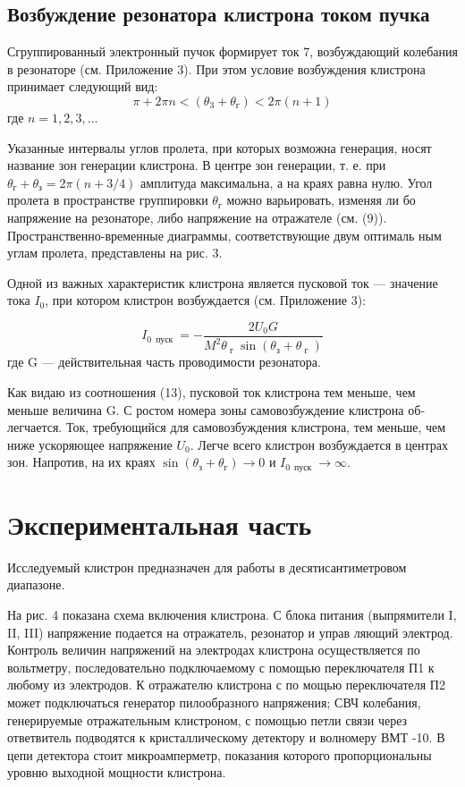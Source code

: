 \subsection{Возбуждение резонатора клистрона током пучка}
Сгруппированный электронный пучок формирует ток 7, возбуждающий
колебания в резонаторе (см. Приложение 3). При этом условие возбуждения
клистрона принимает следующий вид:
\begin{equation}
	\pi + 2 \pi n < \left( \theta _ { 3 } + \theta _ { \text{г} } \right) < 2 \pi ( n + 1 )
\end{equation}где $n=1,2,3,\dots $

Указанные интервалы углов пролета, при которых возможна генерация,
носят название зон генерации клистрона. В центре зон генерации, т. е. при
$\theta _ { \text{г} } + \theta _ { \text{з} } = 2 \pi ( n + 3 / 4 )$ амплитуда максимальна, а на краях равна нулю. Угол
пролета в пространстве группировки $\theta _ { \text{г} }$ можно варьировать, изменяя ли­
бо напряжение на резонаторе, либо напряжение на отражателе (см. (9)).
Пространственно-временные диаграммы, соответствующие двум оптималь­
ным углам пролета, представлены на рис. 3.

Одной из важных характеристик клистрона является пусковой ток — зна­чение тока $I_0$, при котором клистрон возбуждается (см. Приложение 3):

\begin{equation}
	I _ { 0 \, \text { пуск } } = - \frac { 2 U _ { 0 } G } { M ^ { 2 } 
	\theta _ { \text{ г } } \sin \left( \theta _ { \text{з} } + \theta _ { \text{ г } } \right) }
\end{equation} где G — действительная часть проводимости резонатора.

Как видаю из соотношения (13), пусковой ток клистрона тем меньше, чем
меньше величина G. С ростом номера зоны самовозбуждение клистрона об­легчается. Ток, требующийся для самовозбуждения клистрона, тем меньше,
чем ниже ускоряющее напряжение $U_0$. Легче всего клистрон возбуждается
в центрах зон. Напротив, на их краях 
$\sin \left( \theta _ { \text{з} } + \theta _ { \text{г} } \right) \rightarrow 0$ и 
$I _ { 0\, \text { пуск } } \rightarrow \infty$.
\section{Экспериментальная часть}

Исследуемый клистрон предназначен для работы в десятисантиметровом
диапазоне.

На рис. 4 показана схема включения клистрона. С блока питания (выпря­мители I, II, III) напряжение подается на отражатель, резонатор и управ­
ляющий электрод. Контроль величин напряжений на электродах клистрона
осуществляется по вольтметру, последовательно подключаемому с помощью
переключателя П1 к любому из электродов. К отражателю клистрона с по­
мощью переключателя П2 может подключаться генератор пилообразного
напряжения; СВЧ колебания, генерируемые отражательным клистроном, с
помощью петли связи через ответвитель подводятся к кристаллическому
детектору и волномеру ВМТ -10. В цепи детектора стоит микроамперметр,
показания которого пропорциональны уровню выходной мощности клистро­на.

